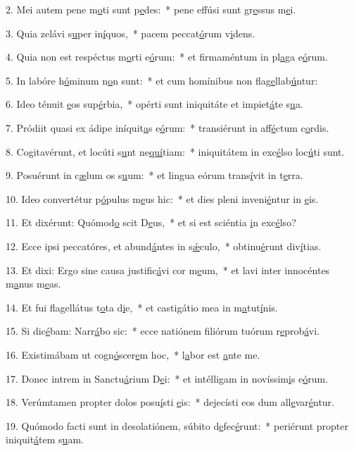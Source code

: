 2. Mei autem pene m\uline{o}ti sunt p\uline{e}des:~* pene effúsi sunt gr\uline{e}ssus m\uline{e}i.\par 
3. Quia zelávi s\uline{u}per in\uline{í}quos,~* pacem peccat\uline{ó}rum v\uline{i}dens.\par 
4. Quia non est respéctus m\uline{o}rti e\uline{ó}rum:~* et firmaméntum in pl\uline{a}ga e\uline{ó}rum.\par 
5. In labóre h\uline{ó}minum n\uline{o}n sunt:~* et cum homínibus non flag\uline{e}llab\uline{ú}ntur:\par 
6. Ideo ténuit \uline{e}os sup\uline{é}rbia,~* opérti sunt iniquitáte et impiet\uline{á}te s\uline{u}a.\par 
7. Pródiit quasi ex ádipe iníquit\uline{a}s e\uline{ó}rum:~* transiérunt in aff\uline{é}ctum c\uline{o}rdis.\par 
8. Cogitavérunt, et locúti s\uline{u}nt ne\uline{quí}tiam:~* iniquitátem in exc\uline{é}lso loc\uline{ú}ti sunt.\par 
9. Posuérunt in c\uline{æ}lum os s\uline{u}um:~* et lingua eórum trans\uline{í}vit in t\uline{e}rra.\par 
10. Ideo convertétur p\uline{ó}pulus m\uline{e}us hic:~* et dies pleni inveni\uline{é}ntur in \uline{e}is.\par 
11. Et dixérunt: Quómod\uline{o} scit D\uline{e}us,~* et si est sciéntia \uline{i}n exc\uline{é}lso?\par 
12. Ecce ipsi peccatóres, et abund\uline{á}ntes in s\uline{ǽ}culo,~* obtinu\uline{é}runt div\uline{í}tias.\par 
13. Et dixi: Ergo sine causa justific\uline{á}vi cor m\uline{e}um,~* et lavi inter innocéntes m\uline{a}nus m\uline{e}as.\par 
14. Et fui flagellátus t\uline{o}ta d\uline{i}e,~* et castigátio mea in m\uline{a}tut\uline{í}nis.\par 
15. Si dic\uline{é}bam: Narr\uline{á}bo sic:~* ecce natiónem filiórum tuórum r\uline{e}prob\uline{á}vi.\par 
16. Existimábam ut cogn\uline{ó}scer\uline{e}m hoc,~* l\uline{a}bor est \uline{a}nte me.\par 
17. Donec intrem in Sanctu\uline{á}rium D\uline{e}i:~* et intélligam in novíssim\uline{i}s e\uline{ó}rum.\par 
18. Verúmtamen propter dolos posu\uline{í}sti \uline{e}is:~* dejecísti eos dum all\uline{e}var\uline{é}ntur.\par 
19. Quómodo facti sunt in desolatiónem, súbito d\uline{e}fec\uline{é}runt:~* periérunt propter iniquit\uline{á}tem s\uline{u}am.\par 
